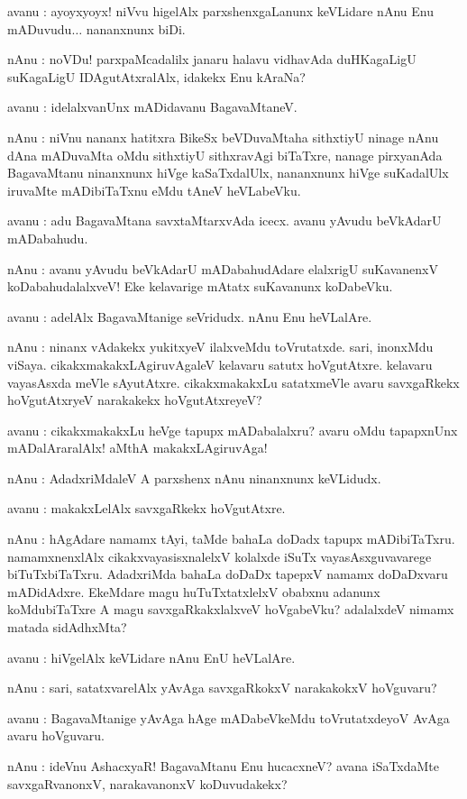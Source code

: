 avanu : ayoyxyoyx! niVvu higelAlx parxshenxgaLanunx keVLidare nAnu Enu mADuvudu$\ldots$ nananxnunx biDi.

nAnu : noVDu! parxpaMcadalilx janaru halavu vidhavAda duHKagaLigU suKagaLigU IDAgutAtxralAlx, idakekx Enu kAraNa?

avanu : idelalxvanUnx mADidavanu BagavaMtaneV.

nAnu : niVnu nananx hatitxra BikeSx beVDuvaMtaha sithxtiyU ninage nAnu dAna mADuvaMta 
oMdu sithxtiyU sithxravAgi biTaTxre, nanage pirxyanAda BagavaMtanu ninanxnunx hiVge kaSaTxdalUlx, nananxnunx hiVge suKadalUlx iruvaMte mADibiTaTxnu eMdu tAneV heVLabeVku.

avanu : adu BagavaMtana savxtaMtarxvAda icecx. avanu yAvudu beVkAdarU mADabahudu.

nAnu : avanu yAvudu beVkAdarU mADabahudAdare elalxrigU suKavanenxV koDabahudalalxveV! Eke kelavarige mAtatx suKavanunx koDabeVku.

avanu : adelAlx BagavaMtanige seVridudx. nAnu Enu heVLalAre.

nAnu : ninanx vAdakekx yukitxyeV ilalxveMdu toVrutatxde. sari, inonxMdu viSaya. cikakxmakakxLAgiruvAgaleV kelavaru satutx hoVgutAtxre. kelavaru vayasAsxda meVle sAyutAtxre. cikakxmakakxLu satatxmeVle avaru savxgaRkekx hoVgutAtxryeV narakakekx hoVgutAtxreyeV?

avanu : cikakxmakakxLu heVge tapupx mADabalalxru? avaru oMdu tapapxnUnx mADalAraralAlx! aMthA makakxLAgiruvAga!

nAnu : AdadxriMdaleV A parxshenx nAnu ninanxnunx keVLidudx.

avanu : makakxLelAlx savxgaRkekx hoVgutAtxre.

nAnu : hAgAdare namamx tAyi, taMde bahaLa doDadx tapupx mADibiTaTxru. namamxnenxlAlx cikakxvayasisxnalelxV kolalxde iSuTx vayasAsxguvavarege biTuTxbiTaTxru. AdadxriMda bahaLa doDaDx tapepxV namamx doDaDxvaru mADidAdxre. EkeMdare magu huTuTxtatxlelxV obabxnu adanunx 
koMdubiTaTxre A magu savxgaRkakxlalxveV hoVgabeVku? adalalxdeV nimamx matada sidAdhxMta?

avanu : hiVgelAlx keVLidare nAnu EnU heVLalAre.

nAnu : sari, satatxvarelAlx yAvAga savxgaRkokxV narakakokxV hoVguvaru?

avanu : BagavaMtanige yAvAga hAge mADabeVkeMdu toVrutatxdeyoV AvAga avaru hoVguvaru.

nAnu : ideVnu AshacxyaR! BagavaMtanu Enu hucacxneV? avana iSaTxdaMte savxgaRvanonxV, narakavanonxV koDuvudakekx?

